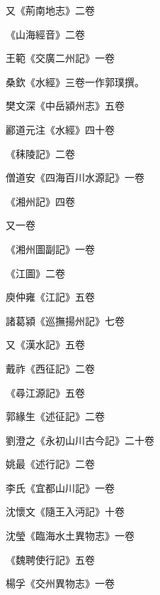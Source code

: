 \begin{pinyinscope}
 又《荊南地志》二卷



 《山海經音》二卷



 王範《交廣二州記》一卷



 桑欽《水經》三卷一作郭璞撰。



 樊文深《中岳潁州志》五卷



 酈道元注《水經》四十卷



 《秣陵記》二卷



 僧道安《四海百川水源記》一卷



 《湘州記》四卷



 又一卷



 《湘州圖副記》一卷



 《江圖》二卷



 庾仲雍《江記》五卷



 諸葛潁《巡撫揚州記》七卷



 又《漢水記》五卷



 戴祚《西征記》二卷



 《尋江源記》五卷



 郭緣生《述征記》二卷



 劉澄之《永初山川古今記》二十卷



 姚最《述行記》二卷



 李氏《宜都山川記》一卷



 沈懷文《隨王入沔記》十卷



 沈瑩《臨海水土異物志》一卷



 《魏聘使行記》五卷



 楊孚《交州異物志》一卷




\end{pinyinscope}
